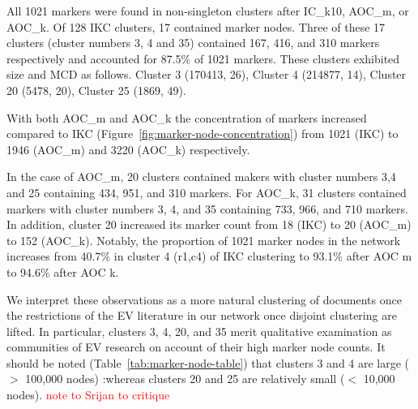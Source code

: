 \documentclass[12pt, oneside]{article}   	%
\begin{document}
All 1021 markers were found in non-singleton clusters after IC\_k10, AOC\_m, or AOC\_k. Of 128 IKC clusters, 17 contained marker nodes. Three of these 17 clusters (cluster numbers 3, 4 and 35) contained 167, 416, and 310 markers respectively and accounted for 87.5\% of 1021 markers. These clusters exhibited size and MCD as follows. Cluster 3 (170413, 26), Cluster 4 (214877, 14), Cluster 20 (5478, 20), Cluster 25 (1869, 49). 

With both AOC\_m and AOC\_k the concentration of markers increased compared to IKC (Figure~\ref{fig:marker-node-concentration}) from 1021 (IKC) to 1946 (AOC\_m) and 3220 (AOC\_k) respectively.

In the case of AOC\_m, 20 clusters contained makers with cluster numbers 3,4 and 25 containing 434, 951, and 310 markers. For AOC\_k, 31 clusters contained markers with cluster numbers 3, 4, and 35 containing 733, 966, and 710 markers. In addition, cluster 20 increased its marker count from 18 (IKC) to 20 (AOC\_m) to 152 (AOC\_k). Notably, the proportion of 1021 marker nodes in the network increases from 40.7\% in cluster 4 (r1,c4) of IKC clustering to 93.1\% after AOC m to 94.6\% after AOC k. 

We interpret these observations as a more natural clustering of documents once the restrictions of the EV literature in our network once disjoint clustering are lifted. In particular, clusters 3, 4, 20, and 35 merit qualitative examination as communities of EV research on account of their high marker node counts. It should be noted (Table~\ref{tab:marker-node-table}) that clusters 3 and 4 are large ($>$ 100,000 nodes) :whereas clusters 20 and 25 are relatively small ($<$ 10,000 nodes). \textcolor{red}{note to Srijan to critique}
\end{document}

